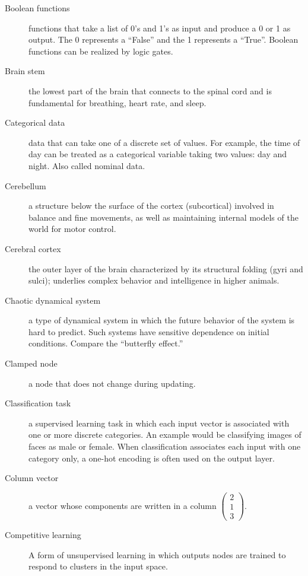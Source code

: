 \begin{description}
\item[Boolean functions] functions that take a list of 0's and 1's as input and produce a 0 or 1 as output. The 0 represents a ``False'' and the 1 represents a ``True''. Boolean functions can be realized by logic gates.

\item[Brain stem] the lowest part of the brain that connects to the spinal cord and is fundamental for breathing, heart rate, and sleep.

\item[Categorical data] data that can take one of a discrete set of values. For example, the time of day can be treated as a categorical variable taking two values: day and night. Also called nominal data.

\item[Cerebellum] a structure below the surface of the cortex (subcortical) involved in balance and fine movements, as well as maintaining internal models of the world for motor control.

\item[Cerebral cortex] the outer layer of the brain characterized by its structural folding (gyri and sulci); underlies complex behavior and intelligence in higher animals. 

\item[Chaotic dynamical system] a type of dynamical system in which the future behavior of the system is hard to predict. Such systems have sensitive dependence on initial conditions. Compare the ``butterfly effect.''

\item[Clamped node] a node that does not change during updating.

\item[Classification task] a supervised learning task in which each input vector is associated with one or more discrete  categories. An example would be classifying images of faces as male or female. When classification associates each input with one category only, a one-hot encoding is often used on the output layer.

\item[Column vector] a vector whose components are written in a column \eg $\displaystyle \begin{pmatrix} 2 \\ 1 \\ 3 \end{pmatrix}$.

\item[Competitive learning] A form of unsupervised learning in which outputs nodes are trained to respond to clusters in the input space. 


\end{description}
